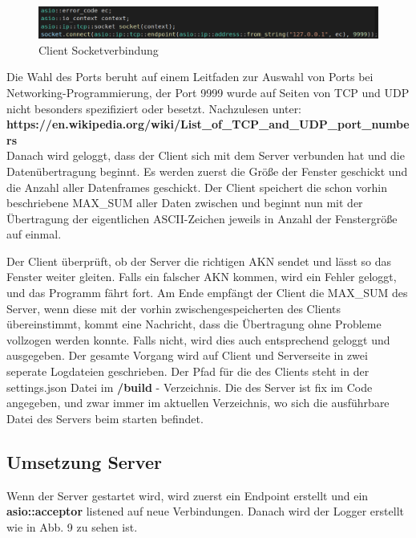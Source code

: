 \documentclass{article}
\begin{document}
\begin{center}
\begin{figure}[h]
    \centering
    \includegraphics[width=\textwidth]{clientep.png}
    \caption{Client Socketverbindung}
\end{figure}
\end{center}

Die Wahl des Ports beruht auf einem Leitfaden zur Auswahl von Ports bei Networking-Programmierung, der Port 9999 wurde auf Seiten von TCP und UDP nicht besonders spezifiziert oder besetzt. Nachzulesen unter:\\ \textbf{https://en.wikipedia.org/wiki/List\_of\_TCP\_and\_UDP\_port\_numbers}
\\
\newline
Danach wird geloggt, dass der Client sich mit dem Server verbunden hat und die Datenübertragung beginnt. Es werden zuerst die Größe der Fenster geschickt und die Anzahl aller Datenframes geschickt. Der Client speichert die schon vorhin beschriebene MAX\_SUM aller Daten zwischen und beginnt nun mit der Übertragung der eigentlichen ASCII-Zeichen jeweils in Anzahl der Fenstergröße auf einmal.

Der Client überprüft, ob der Server die richtigen AKN sendet und lässt so das Fenster weiter gleiten. Falls ein falscher AKN kommen, wird ein Fehler geloggt, und das Programm fährt fort. Am Ende empfängt der Client die MAX\_SUM des Server, wenn diese mit der vorhin zwischengespeicherten des Clients übereinstimmt, kommt eine Nachricht, dass die Übertragung ohne Probleme vollzogen werden konnte. Falls nicht, wird dies auch entsprechend geloggt und ausgegeben. Der gesamte Vorgang wird auf Client und Serverseite in zwei seperate Logdateien geschrieben. Der Pfad für die des Clients steht in der settings.json Datei im \textbf{/build} - Verzeichnis. Die des Server ist fix im Code angegeben, und zwar immer im aktuellen Verzeichnis, wo sich die ausführbare Datei des Servers beim starten befindet.

\subsection{Umsetzung Server}

Wenn der Server gestartet wird, wird zuerst ein Endpoint erstellt und ein \textbf{asio::acceptor} listened auf neue Verbindungen. Danach wird der Logger erstellt wie in Abb. 9 zu sehen ist.
\end{document}

